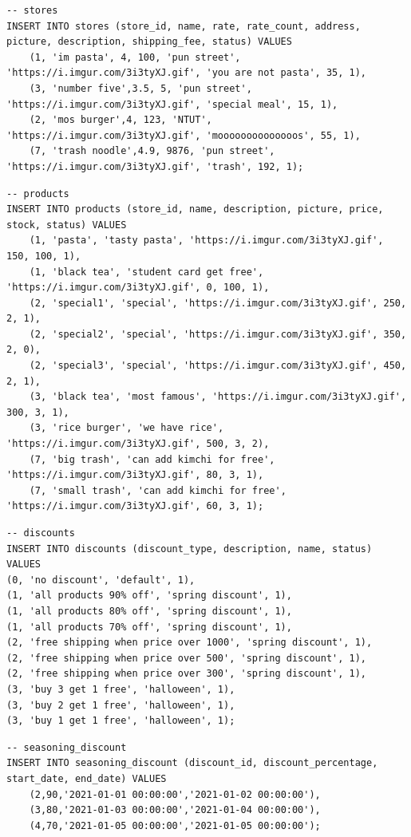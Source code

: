 \documentclass[a4paper, 12pt]{article}
\begin{document}
\begin{lstlisting}
-- stores
INSERT INTO stores (store_id, name, rate, rate_count, address, picture, description, shipping_fee, status) VALUES 
    (1, 'im pasta', 4, 100, 'pun street', 'https://i.imgur.com/3i3tyXJ.gif', 'you are not pasta', 35, 1),
    (3, 'number five',3.5, 5, 'pun street', 'https://i.imgur.com/3i3tyXJ.gif', 'special meal', 15, 1),
    (2, 'mos burger',4, 123, 'NTUT', 'https://i.imgur.com/3i3tyXJ.gif', 'moooooooooooooos', 55, 1),
    (7, 'trash noodle',4.9, 9876, 'pun street', 'https://i.imgur.com/3i3tyXJ.gif', 'trash', 192, 1);
\end{lstlisting}

\begin{lstlisting}
-- products
INSERT INTO products (store_id, name, description, picture, price, stock, status) VALUES
    (1, 'pasta', 'tasty pasta', 'https://i.imgur.com/3i3tyXJ.gif', 150, 100, 1),
    (1, 'black tea', 'student card get free', 'https://i.imgur.com/3i3tyXJ.gif', 0, 100, 1),
    (2, 'special1', 'special', 'https://i.imgur.com/3i3tyXJ.gif', 250, 2, 1),
    (2, 'special2', 'special', 'https://i.imgur.com/3i3tyXJ.gif', 350, 2, 0),
    (2, 'special3', 'special', 'https://i.imgur.com/3i3tyXJ.gif', 450, 2, 1),
    (3, 'black tea', 'most famous', 'https://i.imgur.com/3i3tyXJ.gif', 300, 3, 1),
    (3, 'rice burger', 'we have rice', 'https://i.imgur.com/3i3tyXJ.gif', 500, 3, 2),
    (7, 'big trash', 'can add kimchi for free', 'https://i.imgur.com/3i3tyXJ.gif', 80, 3, 1),
    (7, 'small trash', 'can add kimchi for free', 'https://i.imgur.com/3i3tyXJ.gif', 60, 3, 1);
\end{lstlisting}

\begin{lstlisting}
-- discounts
INSERT INTO discounts (discount_type, description, name, status) VALUES
(0, 'no discount', 'default', 1),
(1, 'all products 90% off', 'spring discount', 1),
(1, 'all products 80% off', 'spring discount', 1),
(1, 'all products 70% off', 'spring discount', 1),
(2, 'free shipping when price over 1000', 'spring discount', 1),
(2, 'free shipping when price over 500', 'spring discount', 1),
(2, 'free shipping when price over 300', 'spring discount', 1),
(3, 'buy 3 get 1 free', 'halloween', 1),
(3, 'buy 2 get 1 free', 'halloween', 1),
(3, 'buy 1 get 1 free', 'halloween', 1);
\end{lstlisting}

\begin{lstlisting}
-- seasoning_discount
INSERT INTO seasoning_discount (discount_id, discount_percentage, start_date, end_date) VALUES
    (2,90,'2021-01-01 00:00:00','2021-01-02 00:00:00'),
    (3,80,'2021-01-03 00:00:00','2021-01-04 00:00:00'),
    (4,70,'2021-01-05 00:00:00','2021-01-05 00:00:00');
\end{lstlisting}
\end{document}
